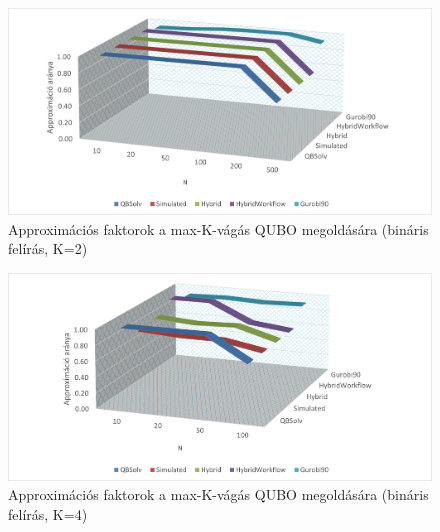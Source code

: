 \begin{figure}[!ht]
	\centering
	\includegraphics[width=150mm, keepaspectratio]{figures/diagrams/maxKCutQUBO_K2approx_bin.png}
	\caption{Approximációs faktorok a max-K-vágás QUBO megoldására (bináris felírás, K=2)}
	\label{fig:maxKCutQUBO_K2approx_bin}
\end{figure}

\begin{figure}[!ht]
	\centering
	\includegraphics[width=150mm, keepaspectratio]{figures/diagrams/maxKCutQUBO_K4approx_bin.png}
	\caption{Approximációs faktorok a max-K-vágás QUBO megoldására (bináris felírás, K=4)}
	\label{fig:maxKCutQUBO_K4approx_bin}
\end{figure}

